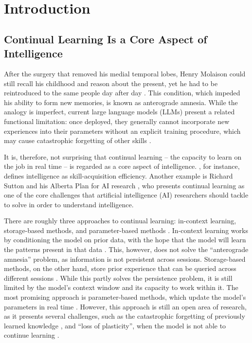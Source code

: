 
\chapter{Introduction}
\label{ch:intro}

\section{Continual Learning Is a Core Aspect of Intelligence}

After the surgery that removed his medial temporal lobes, Henry Molaison could still recall his childhood and reason about the present, yet he had to be reintroduced to the same people day after day \citep{dossani2015legacy_molaison}. This condition, which impeded his ability to form new memories, is known as anterograde amnesia. While the analogy is imperfect, current large language models (LLMs) present a related functional limitation: once deployed, they generally cannot incorporate new experiences into their parameters without an explicit training procedure, which may cause catastrophic forgetting of other skills \citep{Luo2023catastrophic_forgetting_llms}.

It is, therefore, not surprising that continual learning -- the capacity to learn on the job in real time -- is regarded as a core aspect of intelligence. \citet{chollet2019intelligence}, for instance, defines intelligence as skill-acquisition efficiency. Another example is Richard Sutton and his Alberta Plan for AI research \citep{sutton2023albertaplanairesearch}, who presents continual learning as one of the core challenges that artificial intelligence (AI) researchers should tackle to solve in order to understand intelligence.

There are roughly three approaches to continual learning: in-context learning, storage-based methods, and parameter-based methods \citep{pacchiardi2026continual}. In-context learning works by conditioning the model on prior data, with the hope that the model will learn the patterns present in that data \citep{brown2020language_models}. This, however, does not solve the ``anterograde amnesia'' problem, as information is not persistent across sessions. Storage-based methods, on the other hand, store prior experience that can be queried across different sessions \citep{hatalis2024memory, Zhang2025survey_memory_llms}. While this partly solves the persistence problem, it is still limited by the model's context window and its capacity to work within it. The most promising approach is parameter-based methods, which update the model's parameters in real time \citep{shi2025llms_cl}. However, this approach is still an open area of research, as it presents several challenges, such as the catastrophic forgetting of previously learned knowledge \citep{gordon1989catastrophic_interference,Luo2023catastrophic_forgetting_llms}, and ``loss of plasticity'', when the model is not able to continue learning \citep{dohare2024plasticity_loss}.

